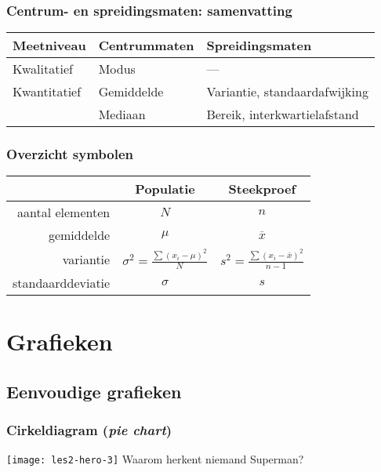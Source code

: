 \documentclass[aspectratio=169]{beamer}
\begin{document}
\begin{frame}
  \frametitle{Centrum- en spreidingsmaten: samenvatting}

  \centering
  \begin{tabular}{lll}
  	\toprule
  	\textbf{Meetniveau} & \textbf{Centrummaten} & \textbf{Spreidingsmaten}      \\
  	\midrule
  	Kwalitatief         & Modus                 & ---                           \\
  	\midrule
  	Kwantitatief        & Gemiddelde            & Variantie, standaardafwijking \\
  	                    & Mediaan               & Bereik, interkwartielafstand  \\
  	\bottomrule
  \end{tabular}
\end{frame}

\begin{frame}
  \frametitle{Overzicht symbolen}

  {\tabulinesep=1.2mm
    \begin{center}
      \begin{tabular}{rcc}
      	\toprule
      	                  & \textbf{Populatie} & \textbf{Steekproef} \\
      	\midrule
      	 aantal elementen &        $N$         &         $n$         \\
      	       gemiddelde &       $\mu$        &   $\overline{x}$    \\
      	        variantie & $\sigma^2 = \frac{\sum (x_i-\mu)^2}{N}$ & $s^2  = \frac{\sum (x_i-\overline{x})^2}{n-1}$ \\
      	standaarddeviatie &      $\sigma$      &         $s$         \\
      	\bottomrule
      \end{tabular}
    \end{center}
  }
\end{frame}

\section{Grafieken}

\subsection{Eenvoudige grafieken}

\begin{frame}
  \frametitle{Cirkeldiagram (\emph{pie chart})}

  \centering
  \texttt{[image: les2-hero-3]}
  Waarom herkent niemand Superman?

\end{frame}
\end{document}
